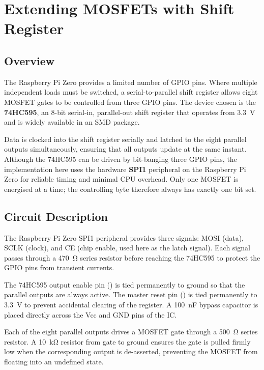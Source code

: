 \section{Extending MOSFETs with Shift Register}

\subsection{Overview}

The Raspberry Pi Zero provides a limited number of GPIO pins. Where multiple independent
loads must be switched, a serial-to-parallel shift register allows eight MOSFET gates to
be controlled from three GPIO pins. The device chosen is the \textbf{74HC595}, an
8-bit serial-in, parallel-out shift register that operates from \SI{3.3}{\volt} and is
widely available in an SMD package.

Data is clocked into the shift register serially and latched to the eight parallel outputs
simultaneously, ensuring that all outputs update at the same instant. Although the
74HC595 can be driven by bit-banging three GPIO pins, the implementation here uses the
hardware \textbf{SPI1} peripheral on the Raspberry Pi Zero for reliable timing and
minimal CPU overhead. Only one MOSFET is energised at a time; the controlling byte
therefore always has exactly one bit set.

\subsection{Circuit Description}

The Raspberry Pi Zero SPI1 peripheral provides three signals: MOSI (data), SCLK (clock),
and CE (chip enable, used here as the latch signal). Each signal passes through a
\SI{470}{\ohm} series resistor before reaching the 74HC595 to protect the GPIO pins
from transient currents.

The 74HC595 output enable pin () is tied permanently to ground so
that the parallel outputs are always active. The master reset pin ()
is tied permanently to \SI{3.3}{\volt} to prevent accidental clearing of the register.
A \SI{100}{\nano\farad} bypass capacitor is placed directly across the Vcc and GND
pins of the IC.

Each of the eight parallel outputs drives a MOSFET gate through a \SI{500}{\ohm}
series resistor. A \SI{10}{\kilo\ohm} resistor from gate to ground ensures the gate
is pulled firmly low when the corresponding output is de-asserted, preventing the
MOSFET from floating into an undefined state.


